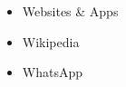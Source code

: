 \documentclass[../presentatie.tex]{subfiles}
\begin{document}
        \parbox[c][0.8\textheight]{0.35\textwidth}{
            \begin{itemize}
                \item<1-> Websites \& Apps
                \par{}
                
                \item<4-> Wikipedia
                \par{}

                \item<6-> WhatsApp
                \par{}
            \end{itemize}
        }\hfil
        \hfil
\end{document}
